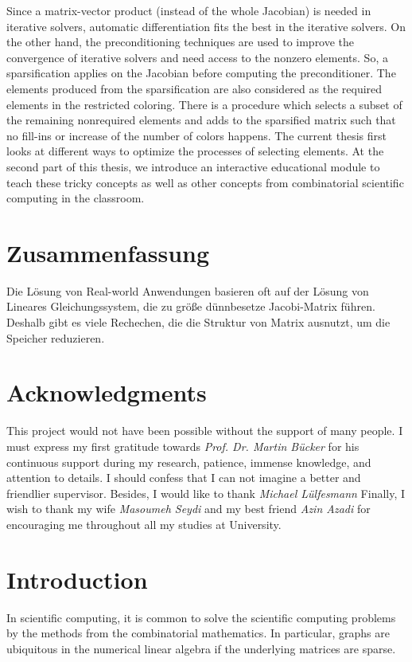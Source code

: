 \documentclass[12pt, twoside,a4paper,toc=bibliography]{scrbook}
\begin{document}
Since a matrix-vector product (instead of the whole Jacobian)
is needed in iterative solvers, automatic differentiation fits
the best in the iterative solvers.
On the other hand, the preconditioning techniques are used to improve the convergence of iterative solvers and need access to the nonzero elements. So, a sparsification applies on the Jacobian before computing the preconditioner. The elements produced from the sparsification are also considered as the required elements in the restricted coloring.
There is a procedure which selects a subset of the remaining nonrequired elements and adds to the sparsified matrix such that no fill-ins or increase of the number of colors happens.
The current thesis first looks at different ways to optimize
the processes of selecting elements.
At the second part of this thesis, we introduce an interactive educational module to teach these
tricky concepts as well as other concepts from combinatorial scientific computing in the classroom.

\chapter*{Zusammenfassung}

Die Lösung von Real-world Anwendungen basieren oft auf der Lösung von Lineares Gleichungssystem,
die zu größe dünnbesetze Jacobi-Matrix führen. Deshalb gibt es viele Rechechen, die 
die Struktur von Matrix ausnutzt, um die Speicher reduzieren.


\chapter*{Acknowledgments}
\noindent This project would not have been possible without
the support of many people. I must express my first gratitude
towards \textit{Prof. Dr. Martin B\"ucker} for his continuous
support during my research, patience, immense knowledge,
and attention to details.
I should confess that I can not imagine a better and friendlier supervisor.
Besides, I would like to thank \textit{Michael Lülfesmann}
Finally, I wish to thank my wife \textit{Masoumeh Seydi} and
my best friend \textit{Azin Azadi} for encouraging me throughout all my studies at University.

\tableofcontents
\chapter{Introduction}
In scientific computing, it is common to solve the scientific computing problems by the methods from the combinatorial mathematics. In particular, graphs are ubiquitous in the numerical linear algebra if the underlying matrices are sparse. 
\end{document}
